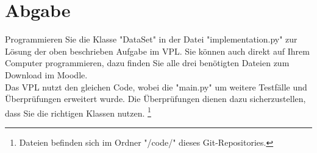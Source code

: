 \documentclass[
	12pt,
	a4paper,
	parskip=full
]{article}
\begin{document}
	\section{Abgabe}
		Programmieren Sie die Klasse "DataSet" in der Datei "implementation.py" zur Lösung der oben beschrieben Aufgabe im VPL.
		Sie können auch direkt auf Ihrem Computer programmieren, dazu finden Sie alle drei benötigten Dateien zum Download im Moodle.
		\\
		Das VPL nutzt den gleichen Code, wobei die "main.py" um weitere Testfälle und Überprüfungen erweitert wurde.
		Die Überprüfungen dienen dazu sicherzustellen, dass Sie die richtigen Klassen nutzen.
		\footnote{Dateien befinden sich im Ordner "/code/" dieses Git-Repositories.}
\end{document}
